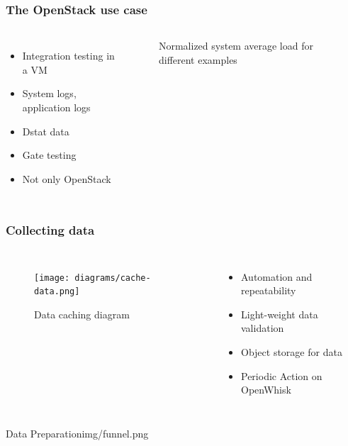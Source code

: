 \documentclass[aspectratio=169,11pt,hyperref={colorlinks=true}]{beamer}
\begin{document}
\begin{frame}
    \frametitle{The OpenStack use case}
    \begin{columns}
        \begin{itemize}
            \item{Integration testing in a VM}
            \item{System logs, application logs}
            \item{Dstat data}
            \item{Gate testing}
            \item{Not only OpenStack}
        \end{itemize}
        \begin{figure}
        \begin{center}
            \caption{Normalized system average load for different examples}
        \end{center}
        \end{figure}
    \end{columns}
\end{frame}

\begin{frame}
    \frametitle{Collecting data}
    \begin{columns}
        \begin{figure}
        \begin{center}
          \texttt{[image: diagrams/cache-data.png]}
             \caption{Data caching diagram}
        \end{center}
        \end{figure}
        \begin{itemize}
            \item{Automation and repeatability}
            \item{Light-weight data validation}
            \item{Object storage for data}
            \item{Periodic Action on OpenWhisk}
        \end{itemize}
    \end{columns}
\end{frame}

\begin{sectionpic}
{Data Preparation}{img/funnel.png}
\end{sectionpic}
\end{document}
